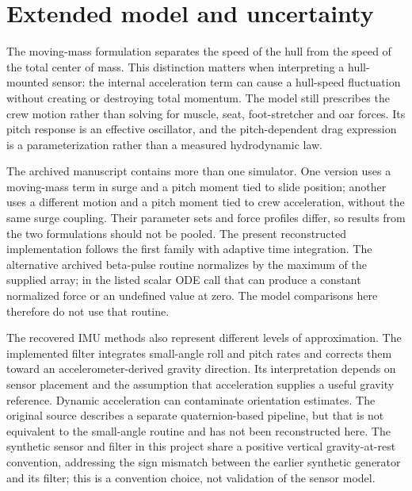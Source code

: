 \documentclass[11pt]{article}
\begin{document}
\section{Extended model and uncertainty}
The moving-mass formulation separates the speed of the hull from the speed of the total center of mass. This distinction matters when interpreting a hull-mounted sensor: the internal acceleration term can cause a hull-speed fluctuation without creating or destroying total momentum. The model still prescribes the crew motion rather than solving for muscle, seat, foot-stretcher and oar forces. Its pitch response is an effective oscillator, and the pitch-dependent drag expression is a parameterization rather than a measured hydrodynamic law.

The archived manuscript contains more than one simulator. One version uses a moving-mass term in surge and a pitch moment tied to slide position; another uses a different motion and a pitch moment tied to crew acceleration, without the same surge coupling. Their parameter sets and force profiles differ, so results from the two formulations should not be pooled. The present reconstructed implementation follows the first family with adaptive time integration. The alternative archived beta-pulse routine normalizes by the maximum of the supplied array; in the listed scalar ODE call that can produce a constant normalized force or an undefined value at zero. The model comparisons here therefore do not use that routine.

The recovered IMU methods also represent different levels of approximation. The implemented filter integrates small-angle roll and pitch rates and corrects them toward an accelerometer-derived gravity direction. Its interpretation depends on sensor placement and the assumption that acceleration supplies a useful gravity reference. Dynamic acceleration can contaminate orientation estimates. The original source describes a separate quaternion-based pipeline, but that is not equivalent to the small-angle routine and has not been reconstructed here. The synthetic sensor and filter in this project share a positive vertical gravity-at-rest convention, addressing the sign mismatch between the earlier synthetic generator and its filter; this is a convention choice, not validation of the sensor model.
\end{document}
